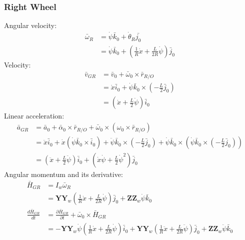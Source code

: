 \documentclass[a4paper,10pt]{article}
\begin{document}
\subsubsection{Right Wheel}
Angular velocity:
\begin{align}
 \bar{\omega}_R &= \dot\psi\bar{k}_0 + \dot\theta_R\bar{j_0} \nonumber \\
 &= \dot\psi\bar{k}_0 + \left(\frac{1}{R}\dot{x}+\frac{L}{2R}\dot\psi\right)\bar{j}_0
\end{align}
Velocity:
\begin{align}
  \bar{v}_{GR} &= \bar{v}_0 + \bar{\omega}_0 \times \bar{r}_{R/O} \nonumber \\
 &= \dot{x}\bar{i}_0 + \dot\psi\bar{k}_0 \times \left(-\frac{L}{2}\bar{j}_0\right) \nonumber \\
 &= \left(\dot{x}+\frac{L}{2}\dot\psi\right)\bar{i}_0  
\end{align}
Linear acceleration:
\begin{align}
 \bar{a}_{GR} &= \bar{a}_0 + \bar\alpha_0 \times \bar{r}_{R/O} + \bar\omega_0 \times \left( \omega_0 \times \bar{r}_{R/O}\right) \nonumber \\
 &= \ddot{x}\bar{i}_0 + \dot{x}\left(\dot\psi\bar{k}_0 \times \bar{i}_0\right)+ \ddot\psi\bar{k}_0 \times \left(-\frac{L}{2}\bar{j}_0\right) + \dot\psi\bar{k}_0 \times \left( \dot\psi\bar{k}_0 \times \left(-\frac{L}{2}\bar{j}_0\right)\right) \nonumber \\
 &= \left(\ddot{x}+\frac{L}{2}\ddot\psi\right)\bar{i}_0 + \left(\dot{x}\dot\psi + \frac{L}{2}\dot\psi^2\right)\bar{j}_0  
\end{align}
Angular momentum and its derivative:
\begin{align}
 \bar{H}_{GR} &= I_w\bar{\omega}_R \nonumber \\
 &= \mathbf{YY}_w\left(\frac{1}{R}\dot{x}+\frac{L}{2R}\dot\psi\right)\bar{j}_0 + \mathbf{ZZ}_w\dot\psi\bar{k}_0\nonumber \\
 \frac{d\bar{H}_{GR}}{dt} &= \frac{\partial \bar{H}_{GR}}{\partial t} + \bar\omega_0 \times \bar{H}_{GR} \nonumber \\
 &=  -\mathbf{YY}_w\dot\psi\left(\frac{1}{R}\dot{x} + \frac{L}{2R}\dot\psi\right)\bar{i}_0
     + \mathbf{YY}_w\left(\frac{1}{R}\ddot{x} + \frac{L}{2R}\ddot\psi\right)\bar{j}_0
                         + \mathbf{ZZ}_w\ddot\psi\bar{k}_0 
\end{align}
\end{document}
